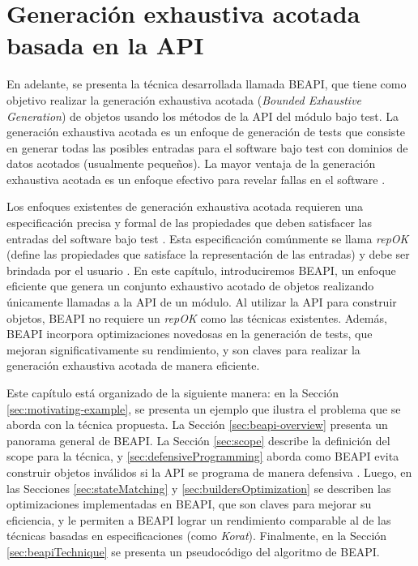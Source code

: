 \chapter{Generación exhaustiva acotada basada en la API}
\label{cap:beapi}

En adelante, se presenta la técnica desarrollada llamada BEAPI, que tiene como
objetivo realizar la generación exhaustiva acotada (\emph{Bounded Exhaustive Generation}) 
de objetos usando los métodos de la API del módulo bajo test. 
La generación exhaustiva acotada es un enfoque de generación de tests que
consiste en generar todas las posibles entradas para el software bajo test con
dominios de datos acotados (usualmente pequeños). 
La mayor ventaja de la generación exhaustiva acotada es un enfoque efectivo para
revelar fallas en el software \cite{} . 

Los enfoques existentes de generación exhaustiva acotada requieren una
especificación precisa y formal de las propiedades que deben satisfacer las
entradas del software bajo test \cite{} . 
Esta especificación comúnmente se llama \emph{repOK} (define las propiedades que
satisface la representación de las entradas) y debe ser brindada por el usuario \cite{} .
En este capítulo, introduciremos BEAPI, un enfoque eficiente que genera un
conjunto exhaustivo acotado de objetos realizando únicamente llamadas a la API
de un módulo. Al utilizar la API para construir objetos, BEAPI no requiere 
un \emph{repOK} como las técnicas existentes. 
Además, BEAPI incorpora optimizaciones novedosas en la generación de tests, que
mejoran significativamente su rendimiento, y son claves para realizar la generación exhaustiva acotada de manera eficiente. 

Este capítulo está organizado de la siguiente manera: en la Sección \ref{sec:motivating-example}, 
se presenta un ejemplo que ilustra el problema que se aborda con la técnica propuesta. 
La Sección \ref{sec:beapi-overview} presenta un panorama general de 
BEAPI. La Sección \ref{sec:scope} describe la definición del scope para la
técnica, y \ref{sec:defensiveProgramming} aborda como BEAPI evita construir
objetos inválidos si la API se programa de manera defensiva \cite{} . 
Luego, en las Secciones \ref{sec:stateMatching} y
 \ref{sec:buildersOptimization} se describen las optimizaciones implementadas en
 BEAPI, que son claves para mejorar su eficiencia, y le permiten a BEAPI 
lograr un rendimiento comparable al de las técnicas basadas en especificaciones
(como \emph{Korat}\cite{Boyapati02}). Finalmente, en la Sección 
\ref{sec:beapiTechnique} se presenta un pseudocódigo del algoritmo de BEAPI.


